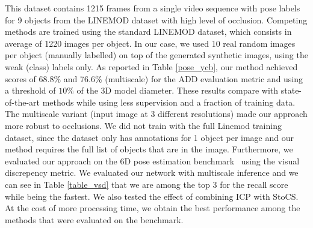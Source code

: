 \documentclass[letterpaper, 10 pt, conference]{ieeeconf}  %
\begin{document}
This dataset contains 1215 frames from a single video sequence with pose labels for 9 objects from the LINEMOD dataset with high level of occlusion. Competing methods are trained using the standard LINEMOD dataset, which consists in average of 1220 images per object. In our case, we used 10 real random images per object (manually labelled) on top of the generated synthetic images, using the weak (class) labels only. 
As reported in Table \ref{pose_ycb}, our method achieved scores of 68.8\% and 76.6\% (multiscale) for the ADD evaluation metric and using a threshold of $10\%$ of the 3D model diameter. 
These results compare with state-of-the-art methods while using less supervision and a fraction of training data. The multiscale variant (input image at 3 different resolutions) made our approach more robust to occlusions. We did not train with the full Linemod training dataset, since the dataset only has annotations for 1 object per image and our method requires the full list of objects that are in the image. Furthermore, we evaluated our approach on the 6D pose estimation benchmark~\cite{hodan2018bop} using the visual discrepency metric. We evaluated our network with multiscale inference and we can see in Table \ref{table_vsd} that we are among the top 3 for the recall score while being the fastest. We also tested the effect of combining ICP with StoCS. At the cost of more processing time, we obtain the best performance among the methods that were evaluated on the benchmark.
\end{document}
